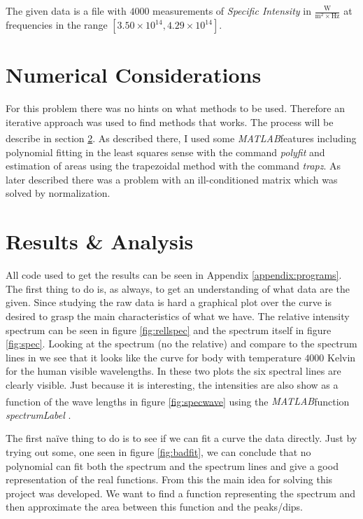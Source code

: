 \documentclass[10pt, a4paper]{article}
\newcommand{\matlab}{\small{\emph{MATLAB\textsuperscript{\textregistered}}}}
\begin{document}
The given data is a file with $4000$ measurements of \emph{Specific Intensity} in $\frac{\mathrm{W}}{\mathrm{m}^2\times \mathrm{Hz}}$ at frequencies in the range $[3.50\times10^{14}, 4.29\times10^{14}]$.

\section{Numerical Considerations}
For this problem there was no hints on what methods to be used. Therefore an iterative approach was used to find methods that works. The process will be describe in section \ref{sec:result}. As described there, I used some \matlab features including polynomial fitting in the least squares sense with the command \emph{polyfit} and estimation of areas using the trapezoidal method with the command \emph{trapz}. As later described there was a problem with an ill-conditioned matrix which was solved by normalization.

\section{Results \& Analysis} \label{sec:result}
All code used to get the results can be seen in Appendix \ref{appendix:programs}. The first thing to do is, as always, to get an understanding of what data are the given. Since studying the raw data is hard a graphical plot over the curve is desired to grasp the main characteristics of what we have. The relative intensity spectrum can be seen in figure \ref{fig:rellspec} and the spectrum itself in figure \ref{fig:spec}. Looking at the spectrum (no the relative) and compare to the spectrum lines in \cite{astronotes1} we see that it looks like the curve for body with temperature $4000$ Kelvin for the human visible wavelengths. In these two plots the six spectral lines are clearly visible. Just because it is interesting, the intensities are also show as a function of the wave lengths in figure \ref{fig:specwave} using the \matlab function \emph{spectrumLabel} \cite{spectrumLabel}.

The first na\"{i}ve thing to do is to see if we can fit a curve the data directly. Just by trying out some, one seen in figure \ref{fig:badfit}, we can conclude that no polynomial can fit both the spectrum and the spectrum lines and give a good representation of the real functions. From this the main idea for solving this project was developed. We want to find a function representing the spectrum and then approximate the area between this function and the peaks/dips.
\end{document}

